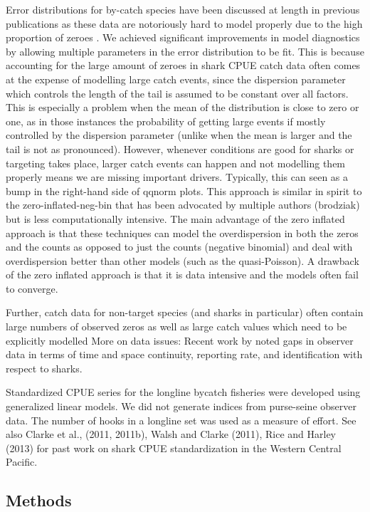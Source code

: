 \documentclass{SCreport}
\begin{document}
Error distributions for by-catch species have been discussed at length in previous publications as these data are notoriously hard to model properly due to the high proportion of zeroes \citep{...}. We achieved significant improvements in model diagnostics by allowing multiple parameters in the error distribution to be fit. This is because accounting for the large amount of zeroes in shark CPUE catch data often comes at the expense of modelling large catch events, since the dispersion parameter which controls the length of the tail is assumed to be constant over all factors. This is especially a problem when the mean of the distribution is close to zero or one, as in those instances the probability of getting large events if mostly controlled by the dispersion parameter (unlike when the mean is larger and the tail is not as pronounced). However, whenever conditions are good for sharks or targeting takes place, larger catch events can happen and not modelling them properly means we are missing important drivers. Typically, this can seen as a bump in the right-hand side of qqnorm plots.
This approach is similar in spirit to the zero-inflated-neg-bin that has been advocated by multiple authors (brodziak) but is less computationally intensive.
The main advantage of the zero inflated approach is that these techniques can model the overdispersion in both the zeros and the counts as opposed to just the counts (negative binomial) and deal with overdispersion better than other models (such as the quasi-Poisson). A drawback of the zero inflated approach is that it is data intensive and the models often fail to converge.

Further, catch data for non-target species (and sharks in particular) often contain large numbers of observed zeros as well as large catch values which need to be explicitly modelled 
More on data issues: Recent work by \citet{Clarke2011_a} noted gaps in observer data in terms of time and  space continuity, reporting rate, and identification with respect to sharks.

Standardized CPUE series for the longline bycatch fisheries were developed using generalized linear models. We did not generate indices from purse-seine observer data. The number of hooks in a longline set was used as a measure of effort.
See also Clarke et al., (2011, 2011b),  Walsh and Clarke (2011), Rice and Harley (2013) for past work on shark CPUE standardization in the Western Central Pacific.
\subsection{Methods}
\end{document}
